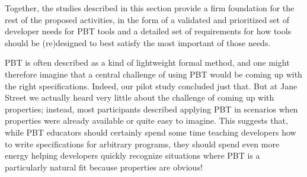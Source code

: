 
\smallskip

Together, the studies described in this section provide a firm
foundation for the rest of the proposed
activities, in the form of a validated and prioritized set of developer
needs for PBT tools and a detailed set of requirements for how tools should be
(re)designed to best satisfy the most important of those needs.

\label{sec:spec}


PBT is often described as a kind of lightweight formal method, and one
might therefore imagine that a central challenge of using PBT would be
coming up with the
right specifications. Indeed, our pilot study concluded just that. But at
Jane Street we actually heard very little about the challenge of coming up with
properties; instead, most participants described applying PBT in scenarios when
properties were already available or quite easy to imagine. This suggests that,
while PBT educators should certainly spend some time teaching developers how to
write specifications for arbitrary programs, they should spend even more energy
helping developers quickly recognize  situations where PBT is a particularly
natural fit because properties are obvious!


